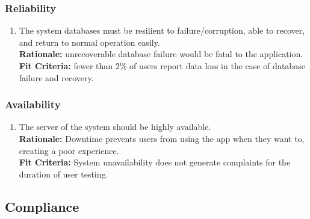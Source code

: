 \documentclass{article}
\begin{document}
\subsubsection{Reliability}
\label{sub:reliability}

\begin{enumerate}[align=left, label=\textbf{QS-R\arabic*.}]
    \item The system databases must be resilient to failure/corruption, able to recover, and return to normal operation easily. \\
          {\bf Rationale:} unrecoverable database failure would be fatal to the application. \\
          {\bf Fit Criteria:} fewer than 2\% of users report data loss in the case of database failure and recovery.
\end{enumerate}


\subsubsection{Availability}
\label{sub:availability}

\begin{enumerate}[align=left, label=\textbf{QS-A\arabic*.}]

    \item The server of the system should be highly available. \\
          {\bf Rationale:} Downtime prevents users from using the app when they want to, creating a poor experience. \\
          {\bf Fit Criteria:} System unavailability does not generate complaints for the duration of user testing.
\end{enumerate}


\subsection{Compliance}
\label{sub:compliance}
\end{document}
